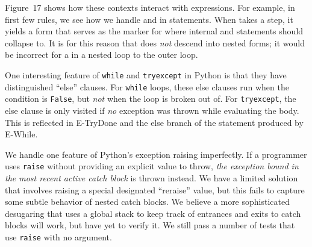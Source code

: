 \documentclass[10pt]{sigplanconf}
\newcommand{\Scribtexttt}[1]{{\texttt{#1}}}
\newcommand{\FigureRef}[2]{#1}
\begin{document}
Figure~\FigureRef{17}{t:x28counter_x28x22figurex22_x22fx3acontrolx22x29x29} shows how these contexts interact with expressions.
For example, in first few rules, we see how we handle  and
 in  statements.  When 
takes a step, it yields a  form that serves as the marker for
where internal  and  statements should
collapse to.  It is for this reason that  does \textit{not} descend
into nested  forms; it would be incorrect for a 
in a nested loop to  the outer loop.

One interesting feature of \Scribtexttt{while} and \Scribtexttt{tryexcept} in Python
is that they have distinguished {``}else{''} clauses.  For \Scribtexttt{while} loops,
these else clauses run when the condition is \Scribtexttt{False}, but \textit{not}
when the loop is broken out of.  For \Scribtexttt{tryexcept}, the else clause is
only visited if \textit{no} exception was thrown while evaluating the body.  This
is reflected in E{-}TryDone and the else branch of the  statement
produced by E{-}While.

We handle one feature of Python{'}s exception raising imperfectly.  If a
programmer uses \Scribtexttt{raise} without providing an explicit value to throw,
\textit{the exception bound in the most recent active catch block} is thrown
instead.  We have a limited solution that involves raising a special designated
{``}reraise{''} value, but this fails to capture some subtle behavior of nested
catch blocks.  We believe a more sophisticated desugaring that uses a global
stack to keep track of entrances and exits to catch blocks will work, but have
yet to verify it.  We still pass a number of tests that use \Scribtexttt{raise}
with no argument.
\end{document}
